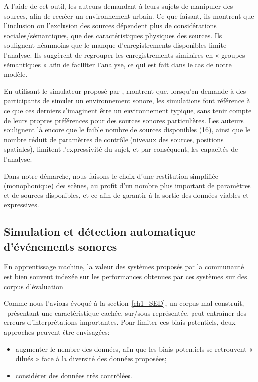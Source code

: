 A l'aide de cet outil, les auteurs demandent à leurs sujets de manipuler des sources, afin de recréer un environnement urbain. Ce que faisant, ils montrent que l'inclusion ou l'exclusion des sources dépendent plus de considérations sociales/sémantiques, que des caractéristiques physiques des sources. Ils soulignent néanmoins que le manque d'enregistrements disponibles limite l'analyse. Ils suggèrent de regrouper les enregistrements similaires en « groupes sémantiques » afin de faciliter l'analyse, ce qui est fait dans le cas de notre modèle. 

En utilisant le simulateur proposé par \citep{bruce2009development}, \citep{davies2014soundscape} montrent que, lorsqu'on demande à des participants de simuler un environnement sonore, les simulations font référence à ce que ces derniers s'imaginent être un environnement typique, sans tenir compte de leurs propres préférences pour des sources sonores particulières. Les auteurs soulignent là encore que le faible nombre de sources disponibles (16), ainsi que le nombre réduit de paramètres de contrôle (niveaux des sources, positions spatiales), limitent l'expressivité du sujet, et par conséquent, les capacités de l'analyse.

Dans notre démarche, nous faisons le choix d'une restitution simplifiée (monophonique) des scènes, au profit d'un nombre plus important de paramètres et de sources disponibles, et ce afin de garantir à la sortie des données viables et expressives.

\subsection{Simulation et détection automatique d'événements sonores}
\label{sec:ch4_modAnaAuto}

En apprentissage machine, la valeur des systèmes proposés par la communauté est bien souvent indexée sur les performances obtenues par ces systèmes sur des corpus d'évaluation.

Comme nous l'avions évoqué à la section~\ref{ch1_SED}, un corpus mal construit, \ie~présentant une caractéristique cachée, sur/sous représentée, peut entraîner des erreurs d'interprétations importantes. Pour limiter ces biais potentiels, deux approches peuvent être envisagées:

\begin{itemize}
\item augmenter le nombre des données, afin que les biais potentiels se retrouvent « dilués » face à la diversité des données proposées;
\item considérer des données très contrôlées.
\end{itemize}

